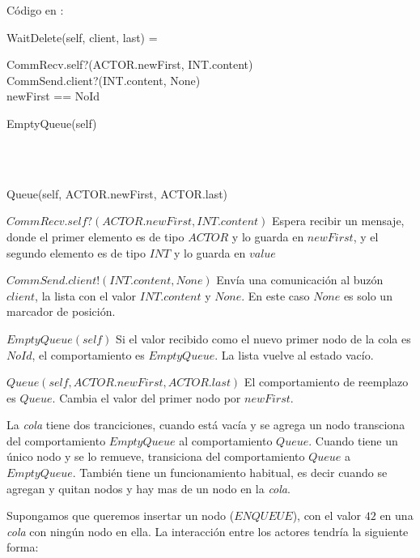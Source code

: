 Código en \CSPm:

\begin{process}
WaitDelete(self, client, last) = \\ \quad
  \begin{block}
  CommRecv.self?(ACTOR.newFirst, INT.content) \then \\ 
  CommSend.client?(INT.content, None) \then \\ 
  \If newFirst == NoId \Then \\ \quad
    \begin{block}
      EmptyQueue(self)
    \end{block} \\ 
  \Then \\ \quad
    \begin{block}
    Queue(self, ACTOR.newFirst, ACTOR.last)
    \end{block}
  \end{block} 
\end{process}

\begin{description}
 \item $CommRecv.self?(ACTOR.newFirst, INT.content)$ Espera recibir un mensaje, donde el primer elemento es de tipo $ACTOR$ y lo guarda en $newFirst$, y el segundo elemento es de tipo $INT$ y lo guarda en $value$
 \item $CommSend.client!(INT.content, None)$ Envía una comunicación al buzón $client$, la lista con el valor $INT.content$ y $None$. En este caso $None$ es solo un marcador de posición. 
 \item $EmptyQueue(self)$ Si el valor recibido como el nuevo primer nodo de la cola es $NoId$, el comportamiento es $EmptyQueue$. La lista vuelve al estado vacío.
 \item $Queue(self, ACTOR.newFirst, ACTOR.last)$ El comportamiento de reemplazo es $Queue$. Cambia el valor del primer nodo por $newFirst$.
 \end{description}
 
La \textit{cola} tiene dos tranciciones, cuando está vacía y se agrega un nodo transciona del comportamiento $EmptyQueue$ al comportamiento $Queue$. Cuando tiene un único nodo y se lo remueve, transiciona del comportamiento $Queue$ a $EmptyQueue$. También tiene un funcionamiento habitual, es decir cuando se agregan y quitan nodos y hay mas de un nodo en la \textit{cola}.

Supongamos que queremos insertar un nodo ($ENQUEUE$), con el valor $42$ en una \textit{cola} con ningún nodo en ella. La interacción entre los actores tendría la siguiente forma:

